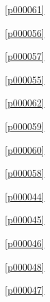 \noindent\figurename\ \ref{p000061}\dotfill\pageref{p000061}

\noindent\figurename\ \ref{p000056}\dotfill\pageref{p000056}

\noindent\figurename\ \ref{p000057}\dotfill\pageref{p000057}

\noindent\figurename\ \ref{p000055}\dotfill\pageref{p000055}

\noindent\figurename\ \ref{p000062}\dotfill\pageref{p000062}

\noindent\figurename\ \ref{p000059}\dotfill\pageref{p000059}

\noindent\figurename\ \ref{p000060}\dotfill\pageref{p000060}

\noindent\figurename\ \ref{p000058}\dotfill\pageref{p000058}

\noindent\figurename\ \ref{p000044}\dotfill\pageref{p000044}

\noindent\figurename\ \ref{p000045}\dotfill\pageref{p000045}

\noindent\figurename\ \ref{p000046}\dotfill\pageref{p000046}

\noindent\figurename\ \ref{p000048}\dotfill\pageref{p000048}

\noindent\figurename\ \ref{p000047}\dotfill\pageref{p000047}









